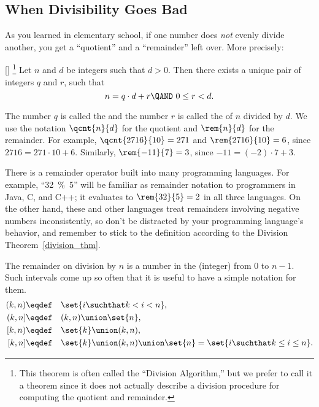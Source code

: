 \subsection{When Divisibility Goes Bad}

As you learned in elementary school, if one number does \emph{not}
evenly divide another, you get a ``quotient'' and a ``remainder'' left
over.  More precisely:
\begin{theorem}\label{division_thm}[]%
\footnote{This theorem is often called the ``Division Algorithm,'' but
  we prefer to call it a theorem since it does not actually describe
  a division procedure for computing the quotient and remainder.}  Let
$n$ and $d$ be integers such that $d > 0$.  Then there exists a unique
pair of integers $q$ and $r$, such that
\begin{equation}\label{nqdr}
n = q \cdot d + r \QAND\ 0 \leq r < d.
\end{equation}
\end{theorem}
The number $q$ is called the  and the number $r$ is
called the  of $n$ divided by $d$.  We use the
notation $\qcnt{n}{d}$ for the quotient and $\rem{n}{d}$ for the
remainder. For example, $\qcnt{2716}{10} = 271$ and $\rem{2716}{10} =
6$, since $2716 = 271 \cdot 10 + 6$.  Similarly, $\rem{-11}{7} = 3$,
since $-11 = (-2) \cdot 7 + 3$.

There is a remainder operator built into many programming languages.
For example, ``32~\%~5'' will be familiar as remainder notation to
programmers in Java, C, and C++; it evaluates to $\rem{32}{5} =2$ in
all three languages.  On the other hand, these and other languages treat
remainders involving negative numbers inconsistently, so don't be
distracted by your programming language's behavior, and remember to
stick to the definition according to the Division
Theorem~\ref{division_thm}.

The remainder on division by $n$ is a number in the (integer)
 from 0 to $n-1$.  Such intervals come up so often that
it is useful to have a simple notation for them.
\begin{align*}
(k, n) & \eqdef\quad \set{i \suchthat k < i < n},\\
(k, n] & \eqdef\quad (k,n) \union \set{n},\\
[k, n) & \eqdef\quad \set{k} \union (k,n),\\
[k,n] & \eqdef\quad \set{k} \union (k,n) \union \set{n} = \set{i \suchthat k \leq i \leq n}.
\end{align*}

